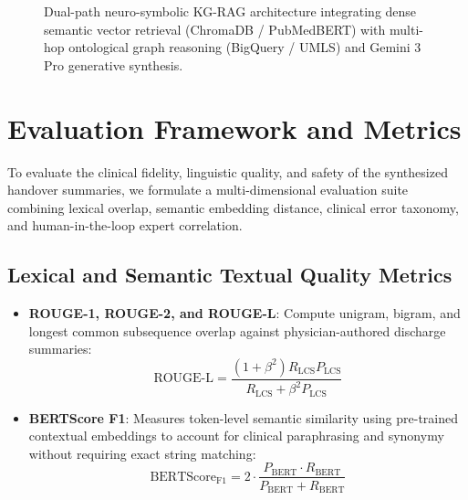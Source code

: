 \documentclass[11pt, a4paper]{article}
\begin{document}
\begin{figure}[H]
{
  }
  \caption{Dual-path neuro-symbolic KG-RAG architecture integrating dense semantic vector retrieval (ChromaDB / PubMedBERT) with multi-hop ontological graph reasoning (BigQuery / UMLS) and Gemini 3 Pro generative synthesis.}
  \label{fig:architecture}
\end{figure}


\section{Evaluation Framework and Metrics}
To evaluate the clinical fidelity, linguistic quality, and safety of the synthesized handover summaries, we formulate a multi-dimensional evaluation suite combining lexical overlap, semantic embedding distance, clinical error taxonomy, and human-in-the-loop expert correlation.

\subsection{Lexical and Semantic Textual Quality Metrics}
\begin{itemize}
  \item \textbf{ROUGE-1, ROUGE-2, and ROUGE-L}: Compute unigram, bigram, and longest common subsequence overlap against physician-authored discharge summaries:
  \begin{equation}
    \text{ROUGE-L} = \frac{(1 + \beta^2) R_{\text{LCS}} P_{\text{LCS}}}{R_{\text{LCS}} + \beta^2 P_{\text{LCS}}}
  \end{equation}
  \item \textbf{BERTScore F1}: Measures token-level semantic similarity using pre-trained contextual embeddings to account for clinical paraphrasing and synonymy without requiring exact string matching:
  \begin{equation}
    \text{BERTScore}_{\text{F1}} = 2 \cdot \frac{P_{\text{BERT}} \cdot R_{\text{BERT}}}{P_{\text{BERT}} + R_{\text{BERT}}}
  \end{equation}
\end{itemize}
\end{document}
